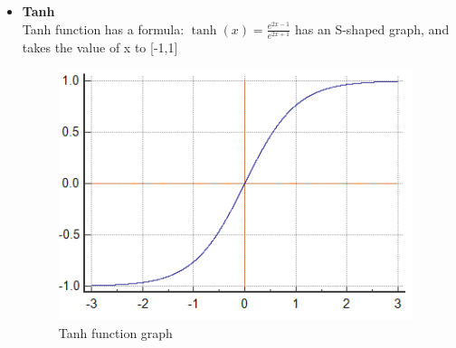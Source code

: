\begin{itemize}
	\item \textbf{Tanh}\\
	Tanh function has a formula:  $\tanh(x) = \frac{e^{2x-1}}{e^{2x+1}}$ has an S-shaped graph, and takes the value of x to [-1,1]
	\begin{center}
		\begin{figure}[H]
			\centering
			\includegraphics[width=0.5\columnwidth]{images/chap2/tanh.png}
			\caption{Tanh function graph}
			\label{chap2:tanh}
		\end{figure}
	\end{center}


\end{itemize}
